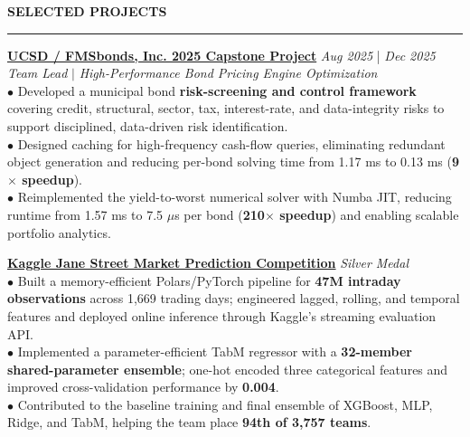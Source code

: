 \documentclass{resume}
\renewcommand{\sectionskip}{\vspace{0.10cm}}
\renewcommand{\sectionlineskip}{\vspace{0.10cm}}
\renewenvironment{rSection}[1]{
\sectionskip
\textcolor{UC San Diego Blue}{\textbf{\large\bfseries\MakeUppercase{#1}}}
\sectionlineskip
\hrule
\begin{list}{}{
\setlength{\leftmargin}{0em}
}
\item[]
}{
\end{list}
}
\begin{document}
\newpage
\begin{rSection}{SELECTED PROJECTS}
\noindent
\href{https://github.com/YuankaiTao-super/Capstone_FMS_2025}{\textbf{UCSD / FMSbonds, Inc. 2025 Capstone Project}} \hfill {\em Aug 2025} | {\em Dec 2025}\\
\textit{Team Lead} $|$ \textit{High-Performance Bond Pricing Engine Optimization}\\[4pt]
$\bullet$ Developed a municipal bond \textbf{risk-screening and control framework} covering credit, structural, sector, tax, interest-rate, and data-integrity risks to support disciplined, data-driven risk identification.\\[1.5pt]
$\bullet$ Designed caching for high-frequency cash-flow queries, eliminating redundant object generation and reducing per-bond solving time from 1.17 ms to 0.13 ms (\textbf{9$\times$ speedup}).\\[1.5pt]
$\bullet$ Reimplemented the yield-to-worst numerical solver with Numba JIT, reducing runtime from 1.57 ms to 7.5 $\mu$s per bond (\textbf{210$\times$ speedup}) and enabling scalable portfolio analytics.

\noindent
\href{https://github.com/YuankaiTao-super/Kaggle2024-Jane-Street-Real-Time-Market-Data-Forecasting}{\textbf{Kaggle Jane Street Market Prediction Competition}} \hfill \textit{Silver Medal}\\
$\bullet$ Built a memory-efficient Polars/PyTorch pipeline for \textbf{47M intraday observations} across 1,669 trading days; engineered lagged, rolling, and temporal features and deployed online inference through Kaggle's streaming evaluation API.\\[1.5pt]
$\bullet$ Implemented a parameter-efficient TabM regressor with a \textbf{32-member shared-parameter ensemble}; one-hot encoded three categorical features and improved cross-validation performance by \textbf{0.004}.\\[1.5pt]
$\bullet$ Contributed to the baseline training and final ensemble of XGBoost, MLP, Ridge, and TabM, helping the team place \textbf{94th of 3,757 teams}.
\end{rSection}
\end{document}
